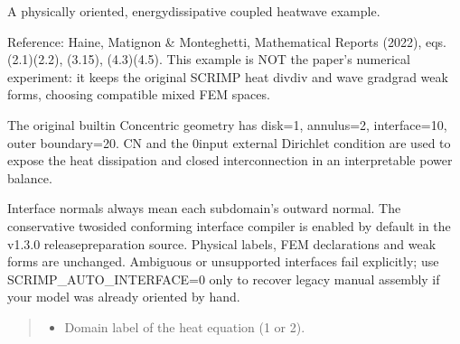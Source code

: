 \documentclass[letterpaper,10pt,english]{sphinxmanual}
\begin{document}
\begin{fulllineitems}

\pysigstartsignatures
\pysiglinewithargsret
{}
{\sphinxparamcomma {}\sphinxparamcomma {}\sphinxparamcomma {}\sphinxparamcomma {}\sphinxparamcomma {}\sphinxparamcomma {}\sphinxparamcomma {}\sphinxparamcomma {}\sphinxparamcomma {}\sphinxparamcomma {}\sphinxparamcomma {}}
{}
\pysigstopsignatures
\sphinxAtStartPar
A physically oriented, energy\sphinxhyphen{}dissipative coupled heat\sphinxhyphen{}wave example.

\sphinxAtStartPar
Reference: Haine, Matignon \& Monteghetti, Mathematical Reports (2022),
eqs. (2.1)\sphinxhyphen{}(2.2), (3.15), (4.3)\sphinxhyphen{}(4.5). This example is NOT the paper’s
numerical experiment: it keeps the original SCRIMP heat div\sphinxhyphen{}div and
wave grad\sphinxhyphen{}grad weak forms, choosing compatible mixed FEM spaces.

\sphinxAtStartPar
The original built\sphinxhyphen{}in Concentric geometry has disk=1, annulus=2,
interface=10, outer boundary=20. CN and the 0\sphinxhyphen{}input external
Dirichlet condition are used to expose the heat dissipation and
closed interconnection in an interpretable power balance.

\sphinxAtStartPar
Interface normals always mean each subdomain’s outward normal.
The conservative two\sphinxhyphen{}sided conforming interface compiler is
enabled by default in the v1.3.0 release\sphinxhyphen{}preparation source.
Physical labels, FEM declarations and weak forms are unchanged.
Ambiguous or unsupported interfaces fail explicitly; use
SCRIMP\_AUTO\_INTERFACE=0 only to recover legacy manual assembly
if your model was already oriented by hand.
\begin{quote}\begin{description}
\begin{itemize}
\item {} 
\sphinxAtStartPar
{} \textendash{} Domain label of the heat equation (1 or 2).


\end{itemize}
\end{description}
\end{quote}
\end{fulllineitems}
\end{document}
